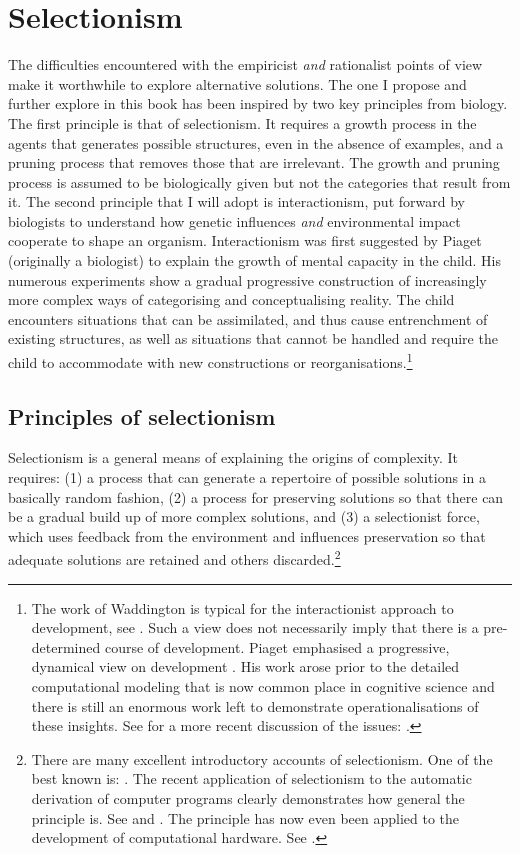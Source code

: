 \section{Selectionism}

The difficulties encountered with the empiricist
{\itshape and} rationalist points of view make it worthwhile
to explore alternative solutions. The one I propose
and further explore in this book 
has been inspired by two key principles 
from biology. The first principle is
that of selectionism. It requires 
a growth process in the agents that generates possible 
structures, even in the absence of examples, and a pruning
process that removes those
that are irrelevant. The growth and pruning
process is assumed to be biologically given
but not the categories that result from it.  
The second principle that 
I will adopt is interactionism, put forward by biologists 
to understand how genetic influences {\itshape and} environmental 
impact cooperate to shape an organism. Interactionism 
was first suggested by Piaget (originally a biologist)
to explain the growth of mental capacity in the child. 
His numerous experiments show a gradual progressive construction of 
increasingly more complex ways of categorising and 
conceptualising reality. The child encounters situations that 
can be assimilated, and thus cause entrenchment of
existing structures, as well 
as situations that cannot be handled and require 
the child to accommodate with new 
constructions or reorganisations.\footnote{
The work of Waddington is typical for the 
interactionist approach to development, see \cite{Waddington:1975}. 
Such a view does not necessarily imply that there is 
a pre-determined course of development.
Piaget emphasised a progressive, dynamical view on 
development \cite{Piaget:1985}. 
His work arose prior to the detailed
computational modeling that is now common place in 
cognitive science and there is still an enormous 
work left to demonstrate operationalisations of these
insights. See for a more recent discussion of 
the issues: \cite{Thelen:1994}.}

\subsection{Principles of selectionism}

Selectionism is a general means of explaining the origins of 
complexity. It requires: (1) a process that 
can generate a repertoire of possible solutions in a 
basically random fashion, (2) a process for preserving
solutions so that there can be a gradual build up of 
more complex solutions, and (3) a 
selectionist force, which uses
feedback from the environment and influences preservation
so that adequate solutions are retained 
and others discarded.\footnote{
There are many excellent introductory 
accounts of selectionism. One of the best
known is: \cite{Dawkins:1995}. The 
recent application of selectionism to the automatic
derivation of computer programs clearly demonstrates
how general the principle is. See \cite{Goldberg:1989} and \cite{Koza:1997}. 
The principle has now even been applied to 
the development of computational hardware. See \cite{Sipper:1998}.}

